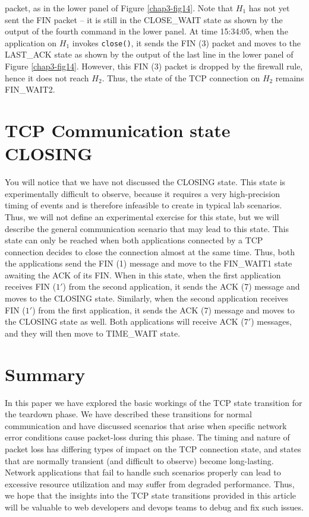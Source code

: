 \begin{multicols}{2}
\noindent
packet, as in the lower panel of Figure \ref{chap3-fig14}. Note that $H_{1}$ has not yet sent the FIN packet -- it is still in the CLOSE\_WAIT state as shown by the output of the fourth command in the lower panel. At time 15:34:05, when the application on $H_{1}$ invokes \lstinline|close()|, it sends the FIN (3) packet and moves to the LAST\_ACK state as shown by the output of the last line in the lower panel of Figure \ref{chap3-fig14}. However, this FIN (3) packet is dropped by the firewall rule, hence it does not reach $H_{2}$. Thus, the state of the TCP connection on $H_{2}$ remains FIN\_WAIT2.


\section{TCP Communication state CLOSING}

You will notice that we have not discussed the CLOSING state. This state is experimentally difficult to observe, because it requires a very high-precision timing of events and is therefore infeasible to create in typical lab scenarios. Thus, we will not define an experimental exercise for this state, but we will describe the general communication scenario that may lead to this state. This state can only be reached when both applications connected by a TCP connection decides to close the connection almost at the same time. Thus, both the applications send the FIN (1) message and move to the FIN\_WAIT1 state awaiting the ACK of its FIN. When in this state, when the first application receives FIN ($1'$) from the second application, it sends the ACK (7) message and moves to the CLOSING state. Similarly, when the second application receives FIN ($1'$) from the first application, it sends the ACK (7) message and moves to the CLOSING state as well. Both applications will receive ACK ($7'$) messages, and they will then move to TIME\_WAIT state.

\section{Summary}

In this paper we have explored the basic workings of the TCP state transition for the teardown phase. We have described these transitions for normal communication and have discussed scenarios that arise when specific network error conditions cause packet-loss during this phase. The timing and nature of packet loss has differing types of impact on the TCP connection state, and states that are normally transient (and difficult to observe) become long-lasting. Network applications that fail to handle such scenarios properly can lead to excessive resource utilization and may suffer from degraded performance. Thus, we hope that the insights into the TCP state transitions provided in this article will be valuable to web developers and devops teams to debug and fix such issues.


\end{multicols}
